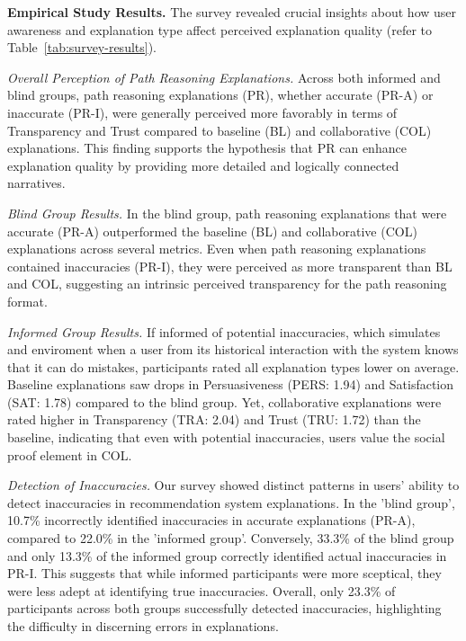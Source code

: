 \documentclass[sigconf]{acmart}
\begin{document}
\vspace{1mm} \noindent \textbf{Empirical Study Results.}
The survey revealed crucial insights about how user awareness and explanation type affect perceived explanation quality (refer to Table~\ref{tab:survey-results}).

\textit{Overall Perception of Path Reasoning Explanations.}
Across both informed and blind groups, path reasoning explanations (PR), whether accurate (PR-A) or inaccurate (PR-I), were generally perceived more favorably in terms of Transparency and Trust compared to baseline (BL) and collaborative (COL) explanations. This finding supports the hypothesis that PR can enhance explanation quality by providing more detailed and logically connected narratives.

\textit{Blind Group Results.}
In the blind group, path reasoning explanations that were accurate (PR-A) outperformed the baseline (BL) and collaborative (COL) explanations across several metrics. Even when path reasoning explanations contained inaccuracies (PR-I), they were perceived as more transparent than BL and COL, suggesting an intrinsic perceived transparency for the path reasoning format.

\textit{Informed Group Results.}
If informed of potential inaccuracies, which simulates and enviroment when a user from its historical interaction with the system knows that it can do mistakes, participants rated all explanation types lower on average. Baseline explanations saw drops in Persuasiveness (PERS: 1.94) and Satisfaction (SAT: 1.78) compared to the blind group. Yet, collaborative explanations were rated higher in Transparency (TRA: 2.04) and Trust (TRU: 1.72) than the baseline, indicating that even with potential inaccuracies, users value the social proof element in COL.

\textit{Detection of Inaccuracies.} Our survey showed distinct patterns in users' ability to detect inaccuracies in recommendation system explanations. In the 'blind group', 10.7\% incorrectly identified inaccuracies in accurate explanations (PR-A), compared to 22.0\% in the 'informed group'. Conversely, 33.3\% of the blind group and only 13.3\% of the informed group correctly identified actual inaccuracies in PR-I. This suggests that while informed participants were more sceptical, they were less adept at identifying true inaccuracies. Overall, only 23.3\% of participants across both groups successfully detected inaccuracies, highlighting the difficulty in discerning errors in explanations.
\end{document}
